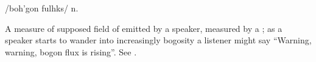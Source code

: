  /boh'gon fulhks/ n.

A measure of supposed field of  emitted by a speaker,
measured by a ; as a speaker starts to wander into
increasingly bogosity a listener might say ``Warning, warning, bogon flux is
rising''. See .

